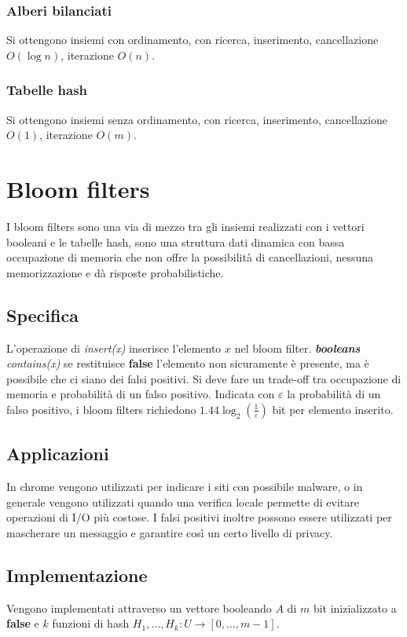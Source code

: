 \subsubsection{Alberi bilanciati}
Si ottengono insiemi con ordinamento, con ricerca, inserimento, cancellazione $O(\log n)$, iterazione $O(n)$.
\subsubsection{Tabelle hash}
Si ottengono insiemi senza ordinamento, con ricerca, inserimento, cancellazione $O(1)$, iterazione $O(m)$. 
\section{Bloom filters}
I bloom filters sono una via di mezzo tra gli insiemi realizzati con i vettori booleani e le tabelle hash, sono una struttura dati dinamica con bassa
occupazione di memoria che non offre la possibilit\`a di cancellazioni, nessuna memorizzazione e d\`a risposte probabilistiche. 
\subsection{Specifica}
L'operazione di \emph{insert(x)} inserisce l'elemento $x$ nel bloom filter. \emph{\textbf{booleans} contains(x)} se restituisce \textbf{false} l'elemento 
non sicuramente \`e presente, ma \`e possibile che ci siano dei falsi positivi. Si deve fare un trade-off tra occupazione di memoria e probabilit\`a di un
falso positivo. Indicata con $\varepsilon$ la probabilit\`a di un falso positivo, i bloom filters richiedono $1.44\log_2(\frac{1}{\varepsilon})$ bit per 
elemento inserito. 
\subsection{Applicazioni}
In chrome vengono utilizzati per indicare i siti con possibile malware, o in generale vengono utilizzati quando una verifica locale permette di evitare 
operazioni di I/O pi\`u costose. I falsi positivi inoltre possono essere utilizzati per mascherare un messaggio e garantire cos\`i un certo livello di 
privacy.
\newpage
\subsection{Implementazione}
Vengono implementati attraverso un vettore booleando $A$ di $m$ bit inizializzato a \textbf{false} e $k$ funzioni di hash $H_1,\dots, H_k:U\rightarrow [0, 
\dots, m-1]$. 
\begin{multicols}{2}

\columnbreak

\end{multicols}
